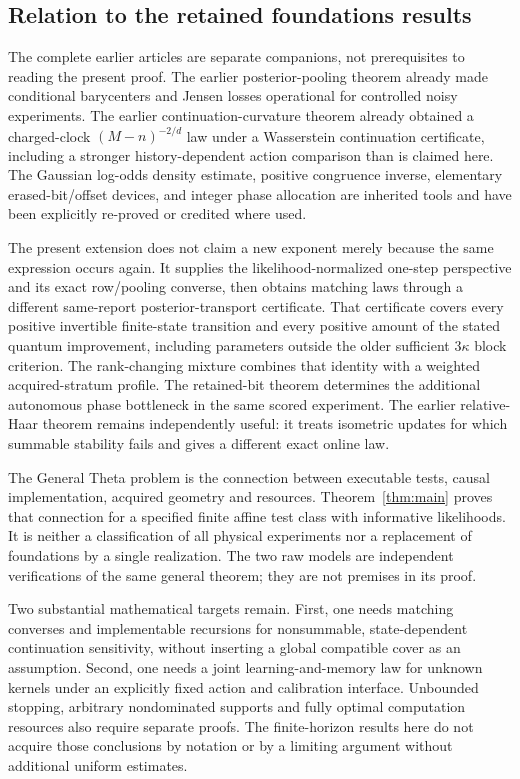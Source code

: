 \subsection{Relation to the retained foundations results}
The complete earlier articles are separate companions, not prerequisites to reading the present proof. The earlier posterior-pooling theorem already made conditional barycenters and Jensen losses operational for controlled noisy experiments. The earlier continuation-curvature theorem already obtained a charged-clock $(M-n)^{-2/d}$ law under a Wasserstein continuation certificate, including a stronger history-dependent action comparison than is claimed here. The Gaussian log-odds density estimate, positive congruence inverse, elementary erased-bit/offset devices, and integer phase allocation are inherited tools and have been explicitly re-proved or credited where used.

The present extension does not claim a new exponent merely because the same expression occurs again. It supplies the likelihood-normalized one-step perspective and its exact row/pooling converse, then obtains matching laws through a different same-report posterior-transport certificate. That certificate covers every positive invertible finite-state transition and every positive amount of the stated quantum improvement, including parameters outside the older sufficient $3\kappa$ block criterion. The rank-changing mixture combines that identity with a weighted acquired-stratum profile. The retained-bit theorem determines the additional autonomous phase bottleneck in the same scored experiment. The earlier relative-Haar theorem remains independently useful: it treats isometric updates for which summable stability fails and gives a different exact online law.

The General Theta problem is the connection between executable tests, causal implementation, acquired geometry and resources. Theorem~\ref{thm:main} proves that connection for a specified finite affine test class with informative likelihoods. It is neither a classification of all physical experiments nor a replacement of foundations by a single realization. The two raw models are independent verifications of the same general theorem; they are not premises in its proof.

Two substantial mathematical targets remain. First, one needs matching converses and implementable recursions for nonsummable, state-dependent continuation sensitivity, without inserting a global compatible cover as an assumption. Second, one needs a joint learning-and-memory law for unknown kernels under an explicitly fixed action and calibration interface. Unbounded stopping, arbitrary nondominated supports and fully optimal computation resources also require separate proofs. The finite-horizon results here do not acquire those conclusions by notation or by a limiting argument without additional uniform estimates.
